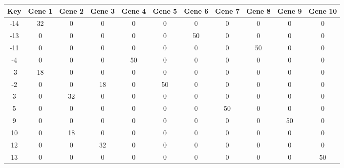 \begin{tabular}{|c|c|c|c|c|c|c|c|c|c|c|}
\hline
Key & Gene 1 & Gene 2 & Gene 3 & Gene 4 & Gene 5 & Gene 6 & Gene 7 & Gene 8 & Gene 9 & Gene 10 \\
\hline
-14 & 32 & 0 & 0 & 0 & 0 & 0 & 0 & 0 & 0 & 0 \\
-13 & 0 & 0 & 0 & 0 & 0 & 50 & 0 & 0 & 0 & 0 \\
-11 & 0 & 0 & 0 & 0 & 0 & 0 & 0 & 50 & 0 & 0 \\
-4 & 0 & 0 & 0 & 50 & 0 & 0 & 0 & 0 & 0 & 0 \\
-3 & 18 & 0 & 0 & 0 & 0 & 0 & 0 & 0 & 0 & 0 \\
-2 & 0 & 0 & 18 & 0 & 50 & 0 & 0 & 0 & 0 & 0 \\
3 & 0 & 32 & 0 & 0 & 0 & 0 & 0 & 0 & 0 & 0 \\
5 & 0 & 0 & 0 & 0 & 0 & 0 & 50 & 0 & 0 & 0 \\
9 & 0 & 0 & 0 & 0 & 0 & 0 & 0 & 0 & 50 & 0 \\
10 & 0 & 18 & 0 & 0 & 0 & 0 & 0 & 0 & 0 & 0 \\
12 & 0 & 0 & 32 & 0 & 0 & 0 & 0 & 0 & 0 & 0 \\
13 & 0 & 0 & 0 & 0 & 0 & 0 & 0 & 0 & 0 & 50 \\
\hline
\end{tabular}